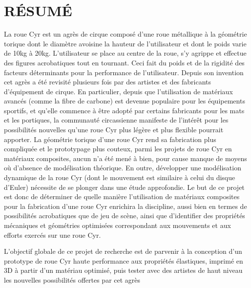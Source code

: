%
\chapter*{RÉSUMÉ}\thispagestyle{headings}

La roue Cyr est un agrès de cirque composé d’une roue métallique à la géométrie torique dont le diamètre avoisine la hauteur de l’utilisateur et dont le poids varie de 10kg à 20kg. L’utilisateur se place au centre de la roue, s’y agrippe et effectue des figures acrobatiques tout en tournant. Ceci fait du poids et de la rigidité des facteurs déterminants pour la performance de l’utilisateur. Depuis son invention cet agrès a été revisité plusieurs fois par des artistes et des fabricants d’équipement de cirque. En particulier, depuis que l’utilisation de matériaux avancés (comme la fibre de carbone) est devenue populaire pour les équipements sportifs, et qu’elle commence à être adopté par certains fabricants pour les mats et les portiques, la communauté circassienne manifeste de l'intérêt pour les possibilités nouvelles qu’une roue Cyr plus légère et plus flexible pourrait apporter. La géométrie torique d’une roue Cyr rend sa fabrication plus compliquée et le prototypage plus couteux, parmi les projets de roue Cyr en matériaux composites, aucun n’a été mené à bien, pour cause manque de moyens où d’absence de modélisation théorique. En outre, développer une modélisation dynamique de la roue Cyr (dont le mouvement est similaire à celui du disque d’Euler) nécessite de se plonger dans une étude approfondie.
Le but de ce projet est donc de déterminer de quelle manière l’utilisation de matériaux composites pour la fabrication d’une roue Cyr enrichira la discipline, aussi bien en termes de possibilités acrobatiques que de jeu de scène, ainsi que d’identifier des propriétés mécaniques et géométries optimisées correspondant aux mouvements et aux efforts exercés sur une roue Cyr.


L'objectif globale de ce projet de recherche est de parvenir à la conception d’un prototype de roue Cyr haute performance aux propriétés élastiques, imprimé en 3D à partir d’un matériau optimisé, puis tester avec des artistes de haut niveau les nouvelles possibilités offertes par cet agrès

